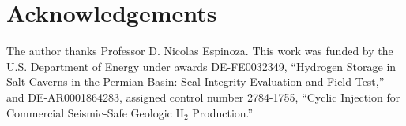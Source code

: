\section*{Acknowledgements}

The author thanks Professor D. Nicolas Espinoza.  This work was funded by the
U.S. Department of Energy under awards DE-FE0032349, ``Hydrogen Storage in Salt
Caverns in the Permian Basin: Seal Integrity Evaluation and Field Test,'' and
DE-AR0001864283, assigned control number 2784-1755, ``Cyclic Injection for
Commercial Seismic-Safe Geologic H$_2$ Production.''
